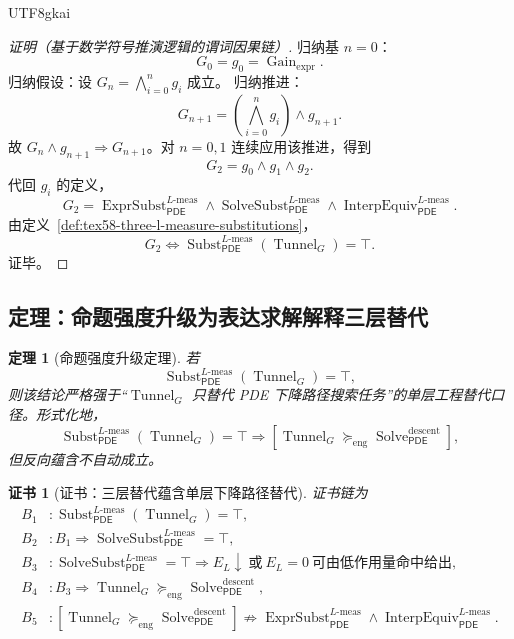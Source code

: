 \documentclass[12pt]{article}
\newtheorem{theorem}{定理}[section]
\newtheorem{Certificate}{证书}[section]
\newcommand{\PDE}{\ensuremath{\mathsf{PDE}}}
\DeclareMathOperator{\Gain}{Gain}
\DeclareMathOperator{\Tunnel}{Tunnel}
\DeclareMathOperator{\Subst}{Subst}
\DeclareMathOperator{\ExprSubst}{ExprSubst}
\DeclareMathOperator{\SolveSubst}{SolveSubst}
\DeclareMathOperator{\InterpEquiv}{InterpEquiv}
\DeclareMathOperator{\Solve}{Solve}
\newcommand{\Lmeas}{L\text{-}\mathrm{meas}}
\begin{document}
\begin{CJK*}{UTF8}{gkai}
\begin{proof}[证明（基于数学符号推演逻辑的谓词因果链）]
归纳基 \(n=0\)：
\[
  G_0=g_0=\Gain_{\mathrm{expr}}.
\]
归纳假设：设 \(G_n=\bigwedge_{i=0}^{n}g_i\) 成立。
归纳推进：
\[
  G_{n+1}
  =
  \left(\bigwedge_{i=0}^{n}g_i\right)\wedge g_{n+1}.
\]
故 \(G_n\wedge g_{n+1}\Rightarrow G_{n+1}\)。对 \(n=0,1\) 连续应用该推进，得到
\[
  G_2
  =
  g_0\wedge g_1\wedge g_2.
\]
代回 \(g_i\) 的定义，
\[
  G_2
  =
  \ExprSubst_{\PDE}^{\Lmeas}
  \wedge
  \SolveSubst_{\PDE}^{\Lmeas}
  \wedge
  \InterpEquiv_{\PDE}^{\Lmeas}.
\]
由定义~\ref{def:tex58-three-l-measure-substitutions}，
\[
  G_2
  \Longleftrightarrow
  \Subst_{\PDE}^{\Lmeas}(\Tunnel_G)=\top.
\]
证毕。
\end{proof}

\subsection{定理：命题强度升级为表达求解解释三层替代}
\label{subsec:tex58-strength-upgrade-theorem}

\begin{theorem}[命题强度升级定理]
\label{thm:tex58-strength-upgrade}
若
\[
  \Subst_{\PDE}^{\Lmeas}(\Tunnel_G)=\top,
\]
则该结论严格强于“\(\Tunnel_G\) 只替代 PDE 下降路径搜索任务”的单层工程替代口径。形式化地，
\[
  \Subst_{\PDE}^{\Lmeas}(\Tunnel_G)=\top
  \Rightarrow
  \left[
  \Tunnel_G
  \succcurlyeq_{\mathrm{eng}}
  \Solve_{\PDE}^{\mathrm{descent}}
  \right],
\]
但反向蕴含不自动成立。
\end{theorem}

\begin{Certificate}[证书：三层替代蕴含单层下降路径替代]
\label{cert:tex58-strength-upgrade}
证书链为
\[
\begin{aligned}
  B_1 &: \Subst_{\PDE}^{\Lmeas}(\Tunnel_G)=\top,\\
  B_2 &: B_1\Rightarrow \SolveSubst_{\PDE}^{\Lmeas}=\top,\\
  B_3 &: \SolveSubst_{\PDE}^{\Lmeas}=\top
  \Rightarrow
  E_L\downarrow\ \text{或}\ E_L=0\ \text{可由低作用量命中给出},\\
  B_4 &: B_3\Rightarrow
  \Tunnel_G\succcurlyeq_{\mathrm{eng}}\Solve_{\PDE}^{\mathrm{descent}},\\
  B_5 &: \left[
  \Tunnel_G\succcurlyeq_{\mathrm{eng}}\Solve_{\PDE}^{\mathrm{descent}}
  \right]
  \not\Rightarrow
  \ExprSubst_{\PDE}^{\Lmeas}\wedge\InterpEquiv_{\PDE}^{\Lmeas}.
\end{aligned}
\]
\end{Certificate}


\end{CJK*}
\end{document}
